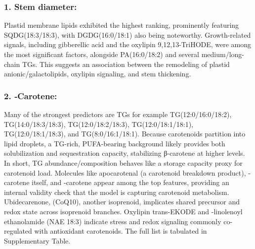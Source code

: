 \documentclass[10pt,letterpaper]{article}
\begin{document}
\begin{itemize}




\subsubsection*{1. Stem diameter:} 
Plastid membrane lipids exhibited the highest ranking, prominently featuring SQDG(18:3/18:3), with DGDG(16:0/18:1) also being noteworthy. Growth-related signals, including gibberellic acid and the oxylipin 9,12,13-TriHODE, were among the most significant factors, alongside PA(16:0/18:2) and several medium/long-chain TGs. This suggests an association between the remodeling of plastid anionic/galactolipids, oxylipin signaling, and stem thickening.

\subsubsection*{2. \textbeta‐Carotene:}
Many of the strongest predictors are TGs for example TG(12:0/16:0/18:2), TG(14:0/18:3/18:3), TG(12:0/18:2/18:3), TG(12:0/18:1/18:1), TG(12:0/18:1/18:3), and TG(8:0/16:1/18:1). Because carotenoids partition into lipid droplets, a TG-rich, PUFA-bearing background likely provides both solubilization and sequestration capacity, stabilizing β-carotene at higher levels. In short, TG abundance/composition behaves like a storage capacity proxy for carotenoid load.
Molecules like apocarotenal (a carotenoid breakdown product), \textbeta-carotene itself, and \textalpha-carotene appear among the top features, providing an internal validity check that the model is capturing carotenoid metabolism. Ubidecarenone, (CoQ10), another isoprenoid, implicates shared precursor and redox state across isoprenoid branches. Oxylipin trans-EKODE and \textgamma-linolenoyl ethanolamide (NAE 18:3) indicate stress and redox signaling commonly co-regulated with antioxidant carotenoids. The full list is tabulated in Supplementary Table. 


\end{itemize}
\end{document}
